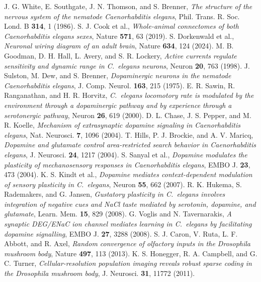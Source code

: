 J. G. White, E. Southgate, J. N. Thomson, and S. Brenner, \emph{The structure of the nervous system of the nematode Caenorhabditis elegans}, Phil. Trans. R. Soc. Lond. B \textbf{314}, 1 (1986).
 S. J. Cook et al., \emph{Whole-animal connectomes of both Caenorhabditis elegans sexes}, Nature \textbf{571}, 63 (2019).
 S. Dorkenwald et al., \emph{Neuronal wiring diagram of an adult brain}, Nature \textbf{634}, 124 (2024).
 M. B. Goodman, D. H. Hall, L. Avery, and S. R. Lockery, \emph{Active currents regulate sensitivity and dynamic range in C.~elegans neurons}, Neuron \textbf{20}, 763 (1998).
 J. Sulston, M. Dew, and S. Brenner, \emph{Dopaminergic neurons in the nematode Caenorhabditis elegans}, J. Comp. Neurol. \textbf{163}, 215 (1975).
 E. R. Sawin, R. Ranganathan, and H. R. Horvitz, \emph{C.~elegans locomotory rate is modulated by the environment through a dopaminergic pathway and by experience through a serotonergic pathway}, Neuron \textbf{26}, 619 (2000).
 D. L. Chase, J. S. Pepper, and M. R. Koelle, \emph{Mechanism of extrasynaptic dopamine signaling in Caenorhabditis elegans}, Nat. Neurosci. \textbf{7}, 1096 (2004).
 T. Hills, P. J. Brockie, and A. V. Maricq, \emph{Dopamine and glutamate control area-restricted search behavior in Caenorhabditis elegans}, J. Neurosci. \textbf{24}, 1217 (2004).
 S. Sanyal et al., \emph{Dopamine modulates the plasticity of mechanosensory responses in Caenorhabditis elegans}, EMBO J. \textbf{23}, 473 (2004).
 K. S. Kindt et al., \emph{Dopamine mediates context-dependent modulation of sensory plasticity in C.~elegans}, Neuron \textbf{55}, 662 (2007).
 R. K. Hukema, S. Rademakers, and G. Jansen, \emph{Gustatory plasticity in C.~elegans involves integration of negative cues and NaCl taste mediated by serotonin, dopamine, and glutamate}, Learn. Mem. \textbf{15}, 829 (2008).
 G. Voglis and N. Tavernarakis, \emph{A synaptic DEG/ENaC ion channel mediates learning in C.~elegans by facilitating dopamine signalling}, EMBO J. \textbf{27}, 3288 (2008).
 S. J. Caron, V. Ruta, L. F. Abbott, and R. Axel, \emph{Random convergence of olfactory inputs in the Drosophila mushroom body}, Nature \textbf{497}, 113 (2013).
 K. S. Honegger, R. A. Campbell, and G. C. Turner, \emph{Cellular-resolution population imaging reveals robust sparse coding in the Drosophila mushroom body}, J. Neurosci. \textbf{31}, 11772 (2011).
